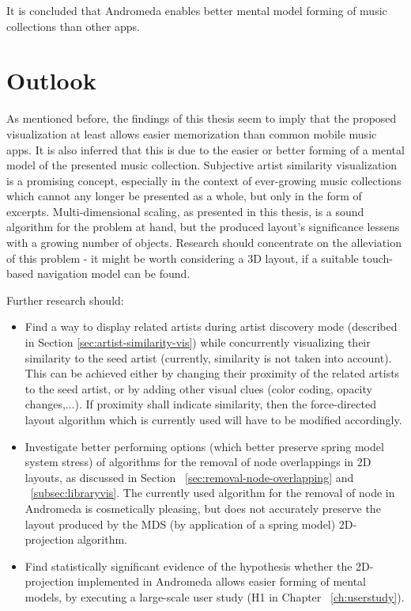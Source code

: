  It is concluded that Andromeda enables better mental model forming of music collections than other apps.

\section{Outlook}

As mentioned before, the findings of this thesis seem to imply that the proposed visualization at least allows easier memorization than common mobile music apps. It is also inferred that this is due to the easier or better forming of a mental model of the presented music collection. Subjective artist similarity visualization is a promising concept, especially in the context of ever-growing music collections which cannot any longer be presented as a whole, but only in the form of excerpts. Multi-dimensional scaling, as presented in this thesis, is a sound algorithm for the problem at hand, but the produced layout's significance lessens with a growing number of objects. Research should concentrate on the alleviation of this problem - it might be worth considering a 3D layout, if a suitable touch-based navigation model can be found.

Further research should:
\begin{itemize}
  \item Find a way to display related artists during artist discovery mode (described in Section \ref{sec:artist-similarity-vis}) while concurrently visualizing their similarity to the seed artist (currently, similarity is not taken into account). This can be achieved either by changing their proximity of the related artists to the seed artist, or by adding other visual clues (color coding, opacity changes,...). If proximity shall indicate similarity, then the force-directed layout algorithm which is currently used will have to be modified accordingly.

  \item Investigate better performing options (which better preserve spring model system stress) of algorithms for the removal of node overlappings in 2D layouts, as discussed in Section ~\ref{sec:removal-node-overlapping} and ~\ref{subsec:libraryvis}. The currently used algorithm for the removal of node in Andromeda is cosmetically pleasing, but does not accurately preserve the layout produced by the MDS (by application of a spring model) 2D-projection algorithm.

  \item Find statistically significant evidence of the hypothesis whether the 2D-projection implemented in Andromeda allows easier forming of mental models, by executing a large-scale user study (H1 in Chapter ~\ref{ch:userstudy}).
\end{itemize}